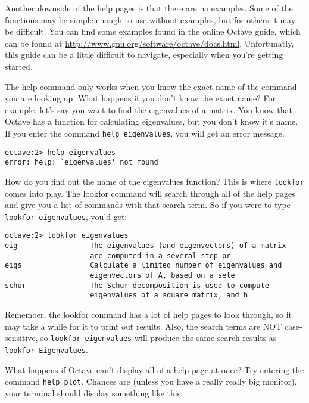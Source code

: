 Another downside of the help pages is that there are no examples. Some of the
functions may be simple enough to use without examples, but for others it
may be difficult. You can find some examples found in the online Octave guide,
which can be found at \url{http://www.gnu.org/software/octave/docs.html}.
Unfortunatly, this guide can be a little difficult to navigate, especially when
you're getting started.

The help command only works when you know the exact name of the command you are
looking up. What happens if you don't know the exact name? For example, let's
say you want to find the eigenvalues of a matrix. You know that Octave has a
function for calculating eigenvalues, but you don't know it's name. If you enter
the command {\tt help eigenvalues}, you will get an error message.

\begin{verbatim}
octave:2> help eigenvalues
error: help: `eigenvalues' not found
\end{verbatim}

How do you find out the name of the eigenvalues function? This is where
{\tt lookfor} comes into play. The lookfor command will search through
all of the help pages and give you a list of commands with that search term. So
if you were to type {\tt lookfor eigenvalues}, you'd get:

\begin{verbatim}
octave:2> lookfor eigenvalues
eig                 The eigenvalues (and eigenvectors) of a matrix 
                    are computed in a several step pr
eigs                Calculate a limited number of eigenvalues and
                    eigenvectors of A, based on a sele
schur               The Schur decomposition is used to compute 
                    eigenvalues of a square matrix, and h
\end{verbatim}

Remember, the lookfor command has a lot of help pages to look through, so it
may take a while for it to print out results. Also, the search
terms are NOT case-sensitive, so {\tt lookfor eigenvalues} will produce the
same search results as {\tt lookfor Eigenvalues}.

What happens if Octave can't display all of a help page at once? Try entering
the command {\tt help plot}. Chances are (unless you have a really really big
monitor), your terminal should display something like this:

